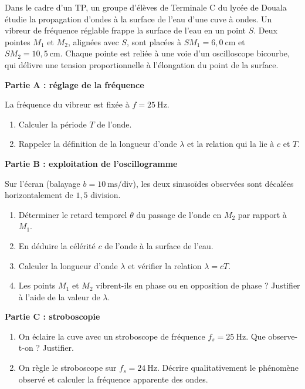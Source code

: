 \documentclass[11pt]{article}
\begin{document}
\begin{exercice}
Dans le cadre d'un TP, un groupe d'élèves de Terminale C du lycée de Douala étudie la propagation d'ondes à la surface de l'eau d'une cuve à ondes. Un vibreur de fréquence réglable frappe la surface de l'eau en un point $S$. Deux pointes $M_1$ et $M_2$, alignées avec $S$, sont placées à $SM_1 = 6{,}0\ \text{cm}$ et $SM_2 = 10{,}5\ \text{cm}$. Chaque pointe est reliée à une voie d'un oscilloscope bicourbe, qui délivre une tension proportionnelle à l'élongation du point de la surface.

\textbf{Partie A : réglage de la fréquence}

La fréquence du vibreur est fixée à $f = 25\ \text{Hz}$.
\begin{enumerate}
\item Calculer la période $T$ de l'onde.
\item Rappeler la définition de la longueur d'onde $\lambda$ et la relation qui la lie à $c$ et $T$.
\end{enumerate}

\textbf{Partie B : exploitation de l'oscillogramme}

Sur l'écran (balayage $b = 10\ \text{ms/div}$), les deux sinusoïdes observées sont décalées horizontalement de $1{,}5$ division.
\begin{enumerate}[resume]
\item Déterminer le retard temporel $\theta$ du passage de l'onde en $M_2$ par rapport à $M_1$.
\item En déduire la célérité $c$ de l'onde à la surface de l'eau.
\item Calculer la longueur d'onde $\lambda$ et vérifier la relation $\lambda = cT$.
\item Les points $M_1$ et $M_2$ vibrent-ils en phase ou en opposition de phase ? Justifier à l'aide de la valeur de $\lambda$.
\end{enumerate}

\textbf{Partie C : stroboscopie}
\begin{enumerate}[resume]
\item On éclaire la cuve avec un stroboscope de fréquence $f_s = 25\ \text{Hz}$. Que observe-t-on ? Justifier.
\item On règle le stroboscope sur $f_s = 24\ \text{Hz}$. Décrire qualitativement le phénomène observé et calculer la fréquence apparente des ondes.
\end{enumerate}
\end{exercice}
\end{document}
